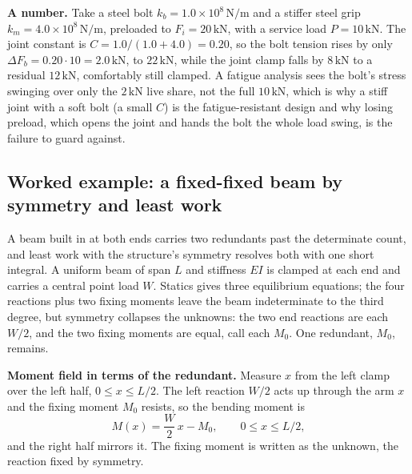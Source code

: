 \textbf{A number.} Take a steel bolt $k_b = 1.0\times 10^{8}\,\si{\newton
\per\meter}$ and a stiffer steel grip $k_m = 4.0\times 10^{8}\,\si{\newton
\per\meter}$, preloaded to $F_i = 20\,\si{\kilo\newton}$, with a service
load $P = 10\,\si{\kilo\newton}$. The joint constant is $C = 1.0/(1.0+4.0)
= 0.20$, so the bolt tension rises by only $\Delta F_b = 0.20\cdot 10 =
2.0\,\si{\kilo\newton}$, to $22\,\si{\kilo\newton}$, while the joint clamp
falls by $8\,\si{\kilo\newton}$ to a residual $12\,\si{\kilo\newton}$,
comfortably still clamped. A fatigue analysis sees the bolt's stress
swinging over only the $2\,\si{\kilo\newton}$ live share, not the full
$10\,\si{\kilo\newton}$, which is why a stiff joint with a soft bolt (a
small $C$) is the fatigue-resistant design and why losing preload, which
opens the joint and hands the bolt the whole load swing, is the failure to
guard against.

\subsection{Worked example: a fixed-fixed beam by symmetry and least work}

A beam built in at both ends carries two redundants past the determinate
count, and least work with the structure's symmetry resolves both with one
short integral. A uniform beam of span $L$ and stiffness $EI$ is clamped at
each end and carries a central point load $W$. Statics gives three
equilibrium equations; the four reactions plus two fixing moments leave the
beam indeterminate to the third degree, but symmetry collapses the unknowns:
the two end reactions are each $W/2$, and the two fixing moments are equal,
call each $M_0$. One redundant, $M_0$, remains.

\textbf{Moment field in terms of the redundant.} Measure $x$ from the left
clamp over the left half, $0\le x\le L/2$. The left reaction $W/2$ acts up
through the arm $x$ and the fixing moment $M_0$ resists, so the bending
moment is
\[
M(x) = \frac{W}{2}\,x - M_0,\qquad 0\le x\le L/2,
\]
and the right half mirrors it. The fixing moment is written as the unknown,
the reaction fixed by symmetry.

